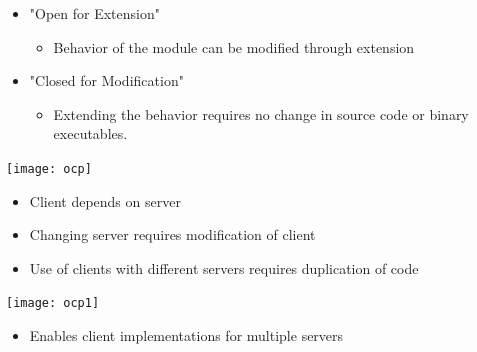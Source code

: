 \documentclass[xcolor=svgnames]{beamer}
\begin{document}

\begin{frame}{\subsecname}

    \begin{itemize}
        \pause \item "Open for Extension"
        \begin{itemize}
            \pause \item Behavior of the module can be modified through
                extension
        \end{itemize}
        \pause \item "Closed for Modification"
        \begin{itemize}
            \pause \item Extending the behavior requires no change in source
                code or binary executables.
        \end{itemize}
    \end{itemize}

\end{frame}


\begin{frame}{\subsecname}
    \centering
    \texttt{[image: ocp]}
    \begin{itemize}
        \pause \item Client depends on server
        \pause \item Changing server requires modification of client
        \pause \item Use of clients with different servers requires duplication
            of code
    \end{itemize}
\end{frame}


\begin{frame}{\subsecname}
    \centering
    \texttt{[image: ocp1]}
    \begin{itemize}
        \pause \item Enables client implementations for multiple servers
    \end{itemize}
\end{frame}

\end{document}
